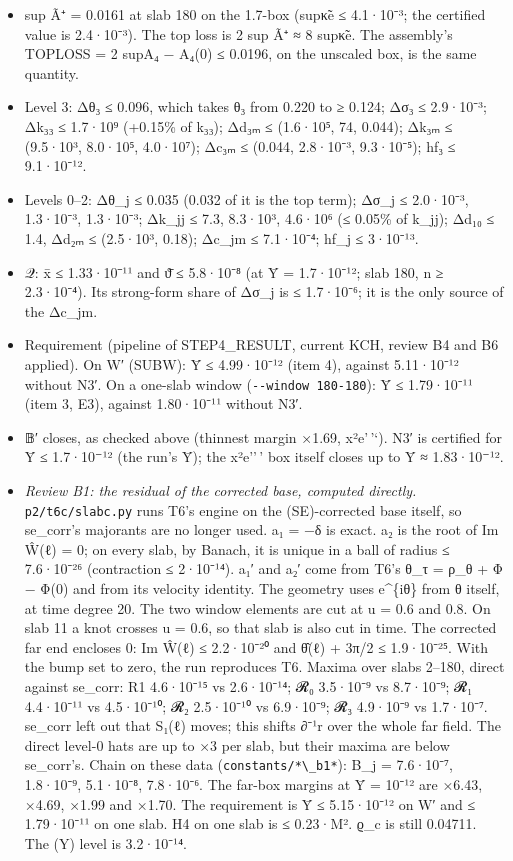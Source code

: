 \documentclass[
]{article}
\providecommand{\tightlist}{%
  \setlength{\itemsep}{0pt}\setlength{\parskip}{0pt}}
\begin{document}
\begin{itemize}
\tightlist
\item
  sup Ã⁺ = 0.0161 at slab 180 on the 1.7-box (sup\textbar κ̃e\textbar{} ≤
  4.1·10⁻³; the certified value is 2.4·10⁻³). The top loss is 2 sup Ã⁺ ≈
  8 sup\textbar κ̃e\textbar. The assembly's TOPLOSS = 2 sup\textbar A₄ −
  A₄(0)\textbar{} ≤ 0.0196, on the unscaled box, is the same quantity.
\item
  Level 3: Δθ₃ ≤ 0.096, which takes θ₃ from 0.220 to ≥ 0.124; Δσ₃ ≤
  2.9·10⁻³; Δk₃₃ ≤ 1.7·10⁹ (+0.15\% of k₃₃); Δd₃ₘ ≤ (1.6·10⁵, 74,
  0.044); Δk₃ₘ ≤ (9.5·10³, 8.0·10⁵, 4.0·10⁷); Δc₃ₘ ≤ (0.044, 2.8·10⁻³,
  9.3·10⁻⁵); hf₃ ≤ 9.1·10⁻¹².
\item
  Levels 0--2: Δθ\_j ≤ 0.035 (0.032 of it is the top term); Δσ\_j ≤
  2.0·10⁻³, 1.3·10⁻³, 1.3·10⁻³; Δk\_jj ≤ 7.3, 8.3·10³, 4.6·10⁶ (≤ 0.05\%
  of k\_jj); Δd₁₀ ≤ 1.4, Δd₂ₘ ≤ (2.5·10³, 0.18); Δc\_jm ≤ 7.1·10⁻⁴;
  hf\_j ≤ 3·10⁻¹³.
\item
  𝒬: x̄ ≤ 1.33·10⁻¹¹ and ϑ̄ ≤ 5.8·10⁻⁸ (at Ȳ = 1.7·10⁻¹²; slab 180, n ≥
  2.3·10⁻⁴). Its strong-form share of Δσ\_j is ≤ 1.7·10⁻⁶; it is the
  only source of the Δc\_jm.
\item
  Requirement (pipeline of STEP4\_RESULT, current KCH, review B4 and B6
  applied). On W′ (SUBW): Ȳ ≤ 4.99·10⁻¹² (item 4), against 5.11·10⁻¹²
  without N3′. On a one-slab window (\texttt{-\/-window\ 180-180}): Ȳ ≤
  1.79·10⁻¹¹ (item 3, E3), against 1.80·10⁻¹¹ without N3′.
\item
  𝔹′ closes, as checked above (thinnest margin ×1.69,
  x²\textbar e'\,'`\textbar). N3′ is certified for Ȳ ≤ 1.7·10⁻¹² (the
  run's Ȳ); the x²\textbar e''\,'\textbar{} box itself closes up to Ȳ ≈
  1.83·10⁻¹².
\item
  \emph{Review B1: the residual of the corrected base, computed
  directly.} \texttt{p2/t6c/slabc.py} runs T6's engine on the
  (SE)-corrected base itself, so se\_corr's majorants are no longer
  used. a₁ = −δ is exact. a₂ is the root of Im Ŵ(ℓ) = 0; on every slab,
  by Banach, it is unique in a ball of radius ≤ 7.6·10⁻²⁶ (contraction ≤
  2·10⁻¹⁴). a₁′ and a₂′ come from T6's θ\_τ = ρ\_θ + Φ − Φ(0) and from
  its velocity identity. The geometry uses e\^{}\{iθ\} from θ itself, at
  time degree 20. The two window elements are cut at u = 0.6 and 0.8. On
  slab 11 a knot crosses u = 0.6, so that slab is also cut in time. The
  corrected far end encloses 0: \textbar Im Ŵ(ℓ)\textbar{} ≤ 2.2·10⁻²⁰
  and \textbar θ̂(ℓ) + 3π/2\textbar{} ≤ 1.9·10⁻²⁵. With the bump set to
  zero, the run reproduces T6. Maxima over slabs 2--180, direct against
  se\_corr: R1 4.6·10⁻¹⁵ vs 2.6·10⁻¹⁴; 𝓡₀ 3.5·10⁻⁹ vs 8.7·10⁻⁹; 𝓡₁
  4.4·10⁻¹¹ vs 4.5·10⁻¹⁰; 𝓡₂ 2.5·10⁻¹⁰ vs 6.9·10⁻⁹; 𝓡₃ 4.9·10⁻⁹ vs
  1.7·10⁻⁷. se\_corr left out that S₁(ℓ) moves; this shifts ∂⁻¹r over
  the whole far field. The direct level-0 hats are up to ×3 per slab,
  but their maxima are below se\_corr's. Chain on these data
  (\texttt{constants/*\textbackslash{}\_b1*}): B\_j = 7.6·10⁻⁷,
  1.8·10⁻⁹, 5.1·10⁻⁸, 7.8·10⁻⁶. The far-box margins at Ȳ = 10⁻¹² are
  ×6.43, ×4.69, ×1.99 and ×1.70. The requirement is Ȳ ≤ 5.15·10⁻¹² on W′
  and ≤ 1.79·10⁻¹¹ on one slab. H4 on one slab is ≤ 0.23·M². ϱ\_c is
  still 0.04711. The (Y) level is 3.2·10⁻¹⁴.
\end{itemize}
\end{document}
